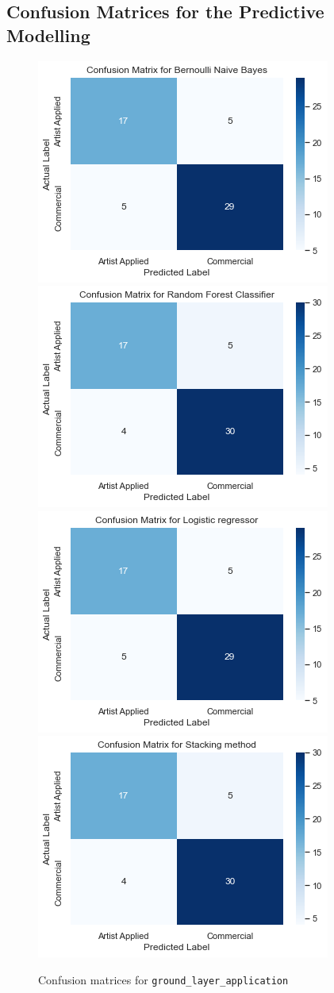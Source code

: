 \documentclass[11pt, oneside]{article}
\begin{document}
\subsection{Confusion Matrices for the Predictive Modelling}

\begin{figure}[H]
\includegraphics[width=.5\textwidth]{images/matNBApp.png}\hfill
\includegraphics[width=.5\textwidth]{images/matRFApp.png} 
\\[\smallskipamount]
\includegraphics[width=.5\textwidth]{images/matLRApp.png}\hfill
\includegraphics[width=.5\textwidth]{images/matStackApp.png}\hfill
\caption{Confusion matrices for \texttt{ground\_layer\_application}}
\label{matApp}
\end{figure}
\end{document}
